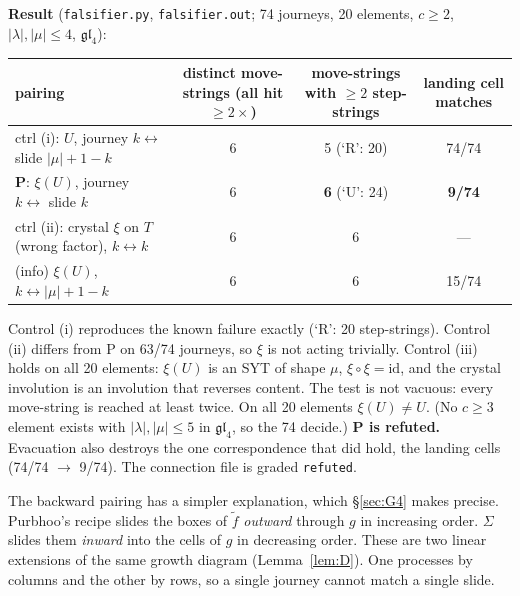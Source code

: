 \documentclass[11pt]{article}
\theoremstyle{definition}
\begin{document}
\textbf{Result} (\texttt{falsifier.py}, \texttt{falsifier.out}; 74 journeys, 20 elements, $c\ge2$, $|\lambda|,|\mu|\le4$, $\mathfrak{gl}_4$):
\begin{center}\begin{tabular}{lccc}\toprule
pairing & distinct move-strings (all hit $\ge2\times$) & move-strings with $\ge2$ step-strings & landing cell matches\\\midrule
ctrl (i): $U$, journey $k\leftrightarrow$ slide $|\mu|{+}1{-}k$ & 6 & 5 (`R': 20) & 74/74\\
\textbf{P}: $\xi(U)$, journey $k\leftrightarrow$ slide $k$ & 6 & \textbf{6} (`U': 24) & \textbf{9/74}\\
ctrl (ii): crystal $\xi$ on $T$ (wrong factor), $k\leftrightarrow k$ & 6 & 6 & ---\\
(info) $\xi(U)$, $k\leftrightarrow|\mu|{+}1{-}k$ & 6 & 6 & 15/74\\\bottomrule
\end{tabular}\end{center}
Control (i) reproduces the known failure exactly (`R': 20 step-strings). Control (ii) differs from P on 63/74 journeys,
so $\xi$ is not acting trivially. Control (iii) holds on all 20 elements: $\xi(U)$ is an SYT of shape $\mu$, $\xi\circ\xi=\mathrm{id}$,
and the crystal involution is an involution that reverses content. The test is not vacuous: every move-string is reached at
least twice. On all 20 elements $\xi(U)\ne U$. (No $c\ge3$ element exists with $|\lambda|,|\mu|\le5$ in $\mathfrak{gl}_4$,
so the 74 decide.) \textbf{P is refuted.} Evacuation also destroys the one correspondence that did hold, the landing
cells (74/74 $\to$ 9/74). The connection file is graded \texttt{refuted}.

The backward pairing has a simpler explanation, which \S\ref{sec:G4} makes precise. Purbhoo's recipe slides the boxes
of $\tilde f$ \emph{outward} through $g$ in increasing order. $\Sigma$ slides them \emph{inward} into the cells of $g$ in
decreasing order. These are two linear extensions of the same growth diagram (Lemma~\ref{lem:D}). One processes
by columns and the other by rows, so a single journey cannot match a single slide.
\end{document}
